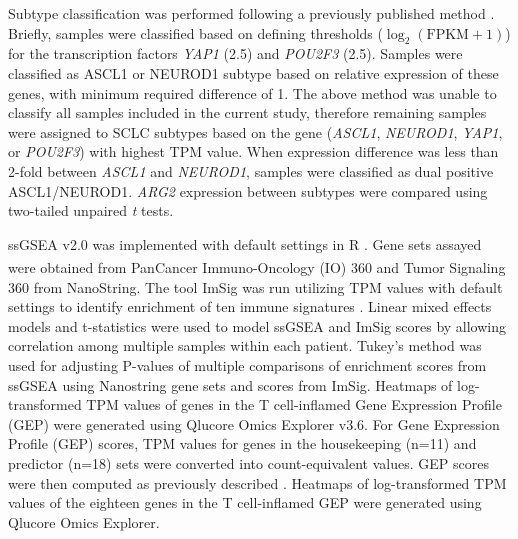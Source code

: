 Subtype classification was performed following a previously published method \cite{best2020}. Briefly, samples were classified based on defining thresholds ($\log_2(\text{FPKM}+1)$) for the transcription factors \textit{YAP1} (2.5) and \textit{POU2F3} (2.5). Samples were classified as ASCL1 or NEUROD1 subtype based on relative expression of these genes, with minimum required difference of 1. The above method was unable to classify all samples included in the current study, therefore remaining samples were assigned to SCLC subtypes based on the gene (\textit{ASCL1}, \textit{NEUROD1}, \textit{YAP1}, or \textit{POU2F3}) with highest TPM value. When expression difference was less than 2-fold between \textit{ASCL1} and \textit{NEUROD1}, samples were classified as dual positive ASCL1/NEUROD1. \textit{ARG2} expression between subtypes were compared using two-tailed unpaired \textit{t} tests.

ssGSEA v2.0 was implemented with default settings in R \cite{barbie2009}. Gene sets assayed were obtained from PanCancer Immuno-Oncology (IO) 360\textsuperscript\texttrademark{} and Tumor Signaling 360 from NanoString. The tool ImSig was run utilizing TPM values with default settings to identify enrichment of ten immune signatures \cite{nirmal2018}. Linear mixed effects models and t-statistics were used to model ssGSEA and ImSig scores by allowing correlation among multiple samples within each patient. Tukey's method was used for adjusting P-values of multiple comparisons of enrichment scores from ssGSEA using Nanostring gene sets and scores from ImSig. Heatmaps of log-transformed TPM values of genes in the T cell-inflamed Gene Expression Profile (GEP) were generated using Qlucore Omics Explorer v3.6. For Gene Expression Profile (GEP) scores, TPM values for genes in the housekeeping (n=11) and predictor (n=18) sets were converted into count-equivalent values. GEP scores were then computed as previously described \cite{cristescu2018}. Heatmaps of log-transformed TPM values of the eighteen genes in the T cell-inflamed GEP were generated using Qlucore Omics Explorer.


